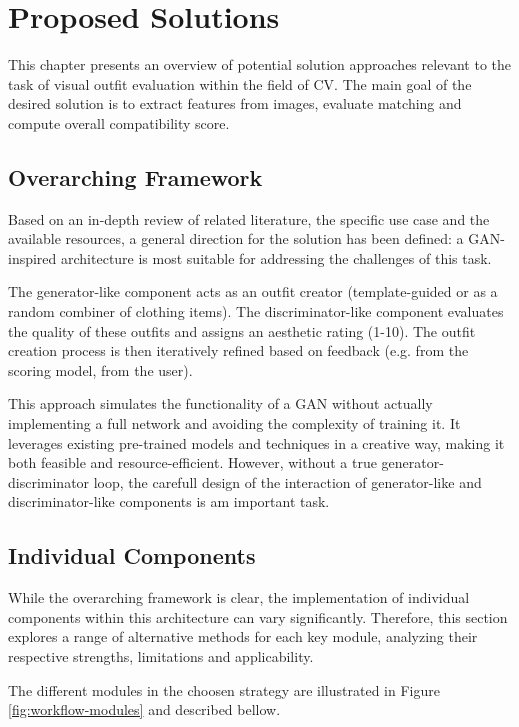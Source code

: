 \chapter{Proposed Solutions}

This chapter presents an overview of potential solution approaches relevant to the task of visual outfit evaluation within the field of \acs{CV}. The main goal of the desired solution is to extract features from images, evaluate matching and compute overall compatibility score. 

\section{Overarching Framework}

Based on an in-depth review of related literature, the specific use case and the available resources, a general direction for the solution has been defined: a \acs{GAN}-inspired architecture is most suitable for addressing the challenges of this task.

The generator-like component acts as an outfit creator (template-guided or as a random combiner of clothing items). The discriminator-like component evaluates the quality of these outfits and assigns an aesthetic rating (1-10). The outfit creation process is then iteratively refined based on feedback (e.g. from the scoring model, from the user).

This approach simulates the functionality of a \acs{GAN} without actually implementing a full network and avoiding the complexity of training it. It leverages existing pre-trained models and techniques in a creative way, making it both feasible and resource-efficient. However, without a true generator-discriminator loop, the carefull design of the interaction of generator-like and discriminator-like components is am important task.

\section{Individual Components}

While the overarching framework is clear, the implementation of individual components within this architecture can vary significantly. Therefore, this section explores a range of alternative methods for each key module, analyzing their respective strengths, limitations and applicability.

The different modules in the choosen strategy are illustrated in Figure \ref{fig:workflow-modules} and described bellow.


